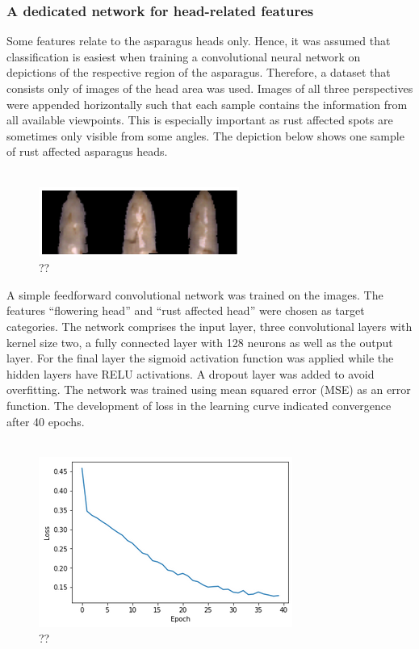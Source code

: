 \subsubsection{A dedicated network for head-related features}

Some features relate to the asparagus heads only. Hence, it was assumed that classification is easiest when training a convolutional neural network on depictions of the respective region of the asparagus. Therefore, a dataset that consists only of images of the head area was used. Images of all three perspectives were appended horizontally such that each sample contains the information from all available viewpoints. This is especially important as rust affected spots are sometimes only visible from some angles. The depiction below shows one sample of rust affected asparagus heads. \\
\\
\begin{figure}[h]
	\centering
	\includegraphics[scale=0.6]{Figures/chapter04/fe_head}
	\decoRule
	\caption[??]{??}
	\label{fig:FeatureEngineeringHead}
\end{figure}

A simple feedforward convolutional network was trained on the images. The features “flowering head” and “rust affected head” were chosen as target categories. The network comprises the input layer, three convolutional layers with kernel size two, a fully connected layer with 128 neurons as well as the output layer. For the final layer the sigmoid activation function was applied while the hidden layers have RELU activations. A dropout layer was added to avoid overfitting. The network was trained using mean squared error (MSE) as an error function. The development of loss in the learning curve indicated convergence after 40 epochs. \\
\\
\begin{figure}[h]
	\centering
	\includegraphics[scale=0.6]{Figures/chapter04/fe_head_curve}
	\decoRule
	\caption[??]{??}
	\label{fig:FeatureEngineeringHeadCurve}
\end{figure}

